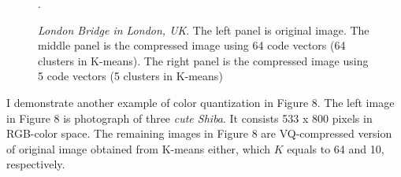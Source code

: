 \documentclass[a4paper]{article}
\begin{document}
\begin{figure}[h!]%
    \centering
    \caption{\textit{London Bridge in London, UK}. The left panel is original image. The middle panel is the compressed image using 64 code vectors (64 clusters in K-means). The right panel is the compressed image using 5 code vectors (5 clusters in K-means)}.
\end{figure}

I demonstrate another example of color quantization in Figure 8. The left image in Figure 8 is photograph of three \textit{cute Shiba}. It consists 533 x 800 pixels in RGB-color space. The remaining images in Figure 8 are VQ-compressed version of original image obtained from K-means either, which $K$ equals to 64 and 10, respectively.
\end{document}
